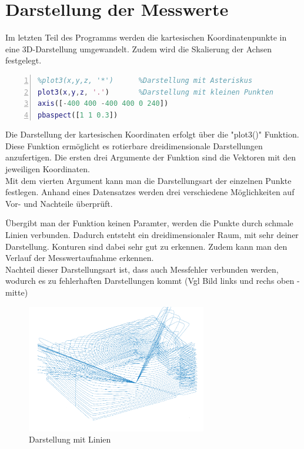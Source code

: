\section{Darstellung der Messwerte}

Im letzten Teil des Programms werden die kartesischen Koordinatenpunkte in eine 3D-Darstellung umgewandelt. Zudem wird die Skalierung der Achsen festgelegt.


\begin{lstlisting}[caption={Darstellung der Messwerte},language={Matlab}, label={import_data}, numbers=left]
%plot3(x,y,z)			%Darstellung mit Linien
%plot3(x,y,z, '*')		%Darstellung mit Asteriskus 
plot3(x,y,z, '.')		%Darstellung mit kleinen Punkten
axis([-400 400 -400 400 0 240])
pbaspect([1 1 0.3])
\end{lstlisting}

Die Darstellung der kartesischen Koordinaten erfolgt über die "plot3()" Funktion. Diese Funktion ermöglicht es rotierbare dreidimensionale Darstellungen anzufertigen. Die ersten drei Argumente der Funktion sind die Vektoren mit den jeweiligen Koordinaten.\\
Mit dem vierten Argument kann man die Darstellungsart der einzelnen Punkte festlegen. Anhand eines Datensatzes werden drei verschiedene Möglichkeiten auf Vor- und Nachteile überprüft.

Übergibt man der Funktion keinen Paramter, werden die Punkte durch schmale Linien verbunden. Dadurch entsteht ein dreidimensionaler Raum, mit sehr deiner Darstellung. Konturen sind dabei sehr gut zu erkennen. Zudem kann man den Verlauf der Messwertaufnahme erkennen. \\
Nachteil dieser Darstellungsart ist, dass auch Messfehler verbunden werden, wodurch es zu fehlerhaften Darstellungen kommt (Vgl Bild links und rechs oben - mitte)


\begin{figure}[H]
	\centering
	\includegraphics[width=0.7\textwidth]{images/Auswertung/Linien}
	\caption{Darstellung mit Linien}
	\label{linien}
\end{figure}

